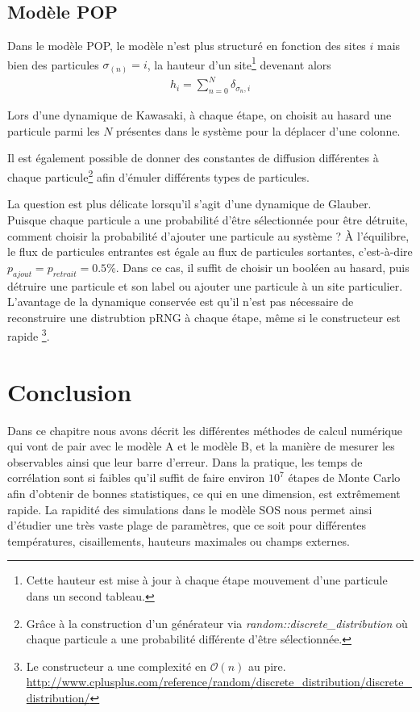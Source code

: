 	\subsection{Modèle POP}		

Dans le modèle POP, le modèle n'est plus structuré en fonction des sites $i$ mais bien des particules $\sigma_(n) = i$, la hauteur d'un site\footnote{Cette hauteur est mise à jour à chaque étape mouvement d'une particule dans un second tableau.} devenant alors
\begin{align}
	h_i = \sum_{n=0}^N \delta_{\sigma_n,i}
\end{align}

Lors d'une dynamique de Kawasaki, à chaque étape, on choisit au hasard une particule parmi les $N$ présentes dans le système pour la déplacer d'une colonne. 

Il est également possible de donner des constantes de diffusion différentes à chaque particule\footnote{Grâce à la construction d'un générateur via \textit{random::discrete\_distribution} où chaque particule a une probabilité différente d'être sélectionnée. }  afin d'émuler différents types de particules. 

La question est plus délicate lorsqu'il s'agit d'une dynamique de Glauber. Puisque chaque particule a une probabilité d'être sélectionnée pour être détruite, comment choisir la probabilité d'ajouter une particule au système ? À l'équilibre, le flux de particules entrantes est égale au flux de particules sortantes, c'est-à-dire $p_{ajout}= p_{retrait} = 0.5\%$. Dans ce cas, il suffit de choisir un booléen au hasard, puis détruire une particule et son label ou ajouter une particule à un site particulier. L'avantage de la dynamique conservée est qu'il n'est pas nécessaire de reconstruire une distrubtion pRNG à chaque étape, même si le constructeur est rapide \footnote{Le constructeur a une complexité en $\mathcal{O}(n)$ au pire. \url{http://www.cplusplus.com/reference/random/discrete_distribution/discrete_distribution/}}.

\section{Conclusion}

Dans ce chapitre nous avons décrit les différentes méthodes de calcul numérique qui vont de pair avec le modèle A et le modèle B, et la manière de mesurer les observables ainsi que leur barre d'erreur. Dans la pratique, les temps de corrélation sont si faibles qu'il suffit de faire environ $10^7$ étapes de Monte Carlo afin d'obtenir de bonnes statistiques, ce qui en une dimension, est extrêmement rapide. La rapidité des simulations dans le modèle SOS nous permet ainsi d'étudier une très vaste plage de paramètres, que ce soit pour différentes températures, cisaillements, hauteurs maximales ou champs externes. 
